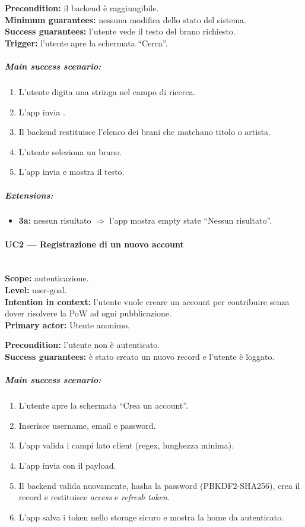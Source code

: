 \textbf{Precondition:} il backend è raggiungibile.\\
\textbf{Minimum guarantees:} nessuna modifica dello stato del sistema.\\
\textbf{Success guarantees:} l'utente vede il testo del brano richiesto.\\
\textbf{Trigger:} l'utente apre la schermata ``Cerca''.

\subparagraph{Main success scenario:}
\begin{enumerate}
    \item L'utente digita una stringa nel campo di ricerca.
    \item L'app invia .
    \item Il backend restituisce l'elenco dei brani che matchano titolo o
    artista.
    \item L'utente seleziona un brano.
    \item L'app invia  e mostra il testo.
\end{enumerate}

\subparagraph{Extensions:}
\begin{itemize}
    \item \textbf{3a:} nessun risultato $\Rightarrow$ l'app mostra empty state
    ``Nessun risultato''.
\end{itemize}

\paragraph{UC2 --- Registrazione di un nuovo account}\hfill\\
\textbf{Scope:} autenticazione.\\
\textbf{Level:} user-goal.\\
\textbf{Intention in context:} l'utente vuole creare un account per
contribuire senza dover risolvere la PoW ad ogni pubblicazione.\\
\textbf{Primary actor:} Utente anonimo.

\textbf{Precondition:} l'utente non è autenticato.\\
\textbf{Success guarantees:} è stato creato un nuovo record  e
l'utente è loggato.

\subparagraph{Main success scenario:}
\begin{enumerate}
    \item L'utente apre la schermata ``Crea un account''.
    \item Inserisce username, email e password.
    \item L'app valida i campi lato client (regex, lunghezza minima).
    \item L'app invia  con il payload.
    \item Il backend valida nuovamente, hasha la password (PBKDF2-SHA256),
    crea il record e restituisce \emph{access} e \emph{refresh token}.
    \item L'app salva i token nello storage sicuro e mostra la home da
    autenticato.
\end{enumerate}

